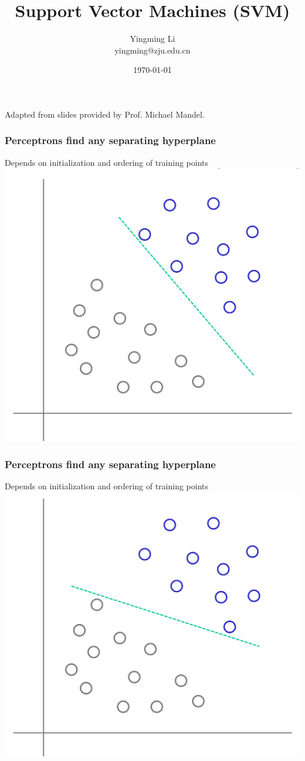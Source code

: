 \documentclass[12pt,notes,mathserif]{beamer}
\title{Support Vector Machines (SVM)}
\author[YingmingLi]{Yingming Li \\ yingming@zju.edu.cn}
\institute[DSERC, ZJU]{Data Science \& Engineering Research Center, ZJU}
\date[\today]{\today}
\begin{document}

\begin{frame}[c]
	\titlepage
	\begin{center}
		Adapted from slides provided by Prof. Michael Mandel.
	\end{center}
\end{frame}

\begin{frame}[c]
	\frametitle{Perceptrons find any separating hyperplane}
	\begin{center}
		Depends on initialization and ordering of training points\\
		\includegraphics[width=0.7\linewidth]{fig8/lec82.jpg}
	\end{center}
\end{frame}
\begin{frame}[c]
	\frametitle{Perceptrons find any separating hyperplane}
	\begin{center}
		Depends on initialization and ordering of training points\\
		\includegraphics[width=0.7\linewidth]{fig8/lec83.jpg}
	\end{center}
\end{frame}
\end{document}
